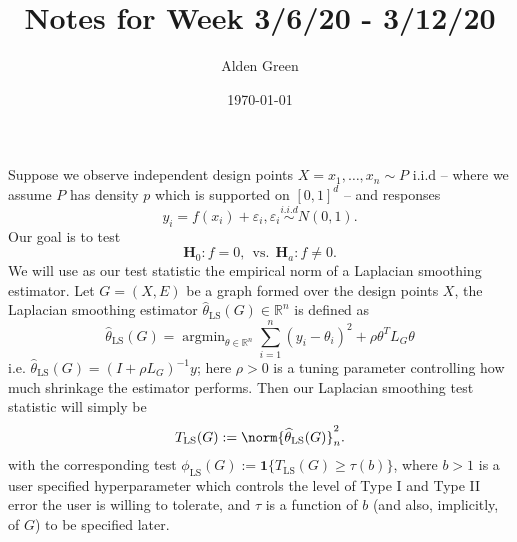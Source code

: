 \documentclass{article}
\newcommand{\Reals}{\mathbb{R}}
\newcommand{\1}{\mathbf{1}}
\DeclareMathOperator*{\argmin}{argmin}
\newcommand{\wh}[1]{\widehat{#1}}
\newcommand{\LS}{\mathrm{LS}}
\theoremstyle{alden}
\theoremstyle{aldenthm}
\theoremstyle{definition}
\theoremstyle{remark}
\begin{document}
\title{Notes for Week 3/6/20 - 3/12/20}
\author{Alden Green}
\date{\today}
\maketitle

Suppose we observe independent design points $X = x_1,\ldots,x_n \sim P$ i.i.d -- where we assume $P$ has density $p$ which is supported on $[0,1]^d$ -- and responses
\begin{equation}
\label{eqn:regression_random_design_known_variance}
y_i = f(x_i) + \varepsilon_i, \varepsilon_i \overset{i.i.d}\sim N(0,1).
\end{equation} 
Our goal is to test
\begin{equation*}
\mathbf{H}_0: f = 0,~~\textrm{vs.}~~\mathbf{H}_a: f \neq 0.
\end{equation*}
We will use as our test statistic the empirical norm of a Laplacian smoothing estimator. Let $G = (X,E)$ be a graph formed over the design points $X$, the Laplacian smoothing estimator $\wh{\theta}_{\LS}(G) \in \Reals^n$ is defined as
\begin{equation}
\label{eqn:laplacian_smoothing_estimator}
\wh{\theta}_{\LS}(G) = \argmin_{\theta \in \Reals^n} \sum_{i = 1}^{n} (y_i - \theta_i)^2 + \rho \theta^T L_G \theta 
\end{equation}
i.e. $\wh{\theta}_{\LS}(G) = (I + \rho L_G)^{-1} y$; here $\rho > 0$ is a tuning parameter controlling how much shrinkage the estimator performs. Then our Laplacian smoothing test statistic will simply be
\begin{equation}
\label{eqn:laplacian_smoothing_statistic}
T_{\LS}(G) := \norm{\wh{\theta}_{\LS}(G)}_n^2.
\end{equation}
with the corresponding test $\phi_{\LS}(G) := \1\{T_{\LS}(G) \geq \tau(b) \}$, where $b > 1$ is a user specified hyperparameter which controls the level of Type I and Type II error the user is willing to tolerate, and $\tau$ is a function of $b$ (and also, implicitly, of $G$) to be specified later.
\end{document}
